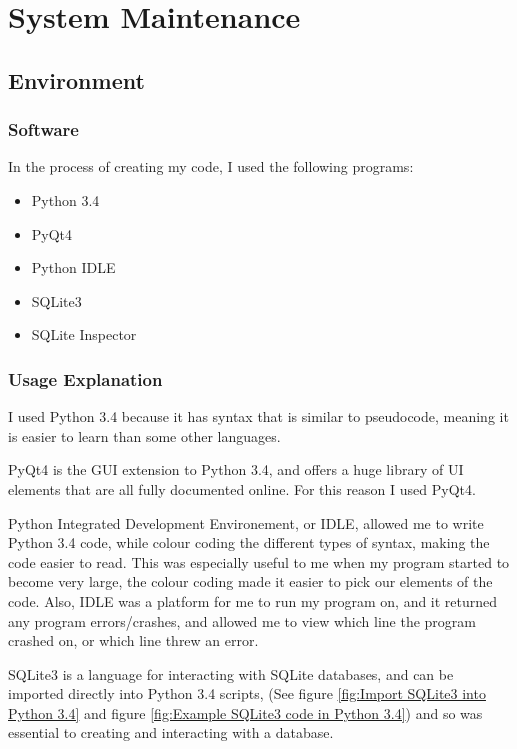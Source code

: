 \chapter{System Maintenance}

\section{Environment}

\subsection{Software}
In the process of creating my code, I used the following programs: 
\begin{itemize}
	\item Python 3.4
	\item PyQt4
	\item Python IDLE
	\item SQLite3
	\item SQLite Inspector
\end{itemize}
\subsection{Usage Explanation}
I used Python 3.4 because it has syntax that is similar to pseudocode, meaning it is easier to learn than some other languages. 

PyQt4 is the GUI extension to Python 3.4, and offers a huge library of UI elements that are all fully documented online. For this reason I used PyQt4. 

Python Integrated Development Environement, or IDLE, allowed me to write Python 3.4 code, while colour coding the different types of syntax, making the code easier to read. This was especially useful to me when my program started to become very large, the colour coding made it easier to pick our elements of the code. Also, IDLE was a platform for me to run my program on, and it returned any program errors/crashes, and allowed me to view which line the program crashed on, or which line threw an error. 

SQLite3 is a language for interacting with SQLite databases, and can be imported directly into Python 3.4 scripts, (See figure \ref{fig:Import SQLite3 into Python 3.4} and  figure \ref{fig:Example SQLite3 code in Python 3.4}) and so was essential to creating and interacting with a database.

